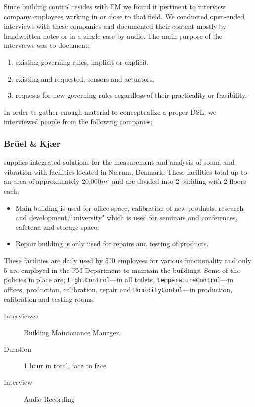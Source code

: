 Since building control resides with FM we found it pertinent to interview company employees working in or close to that field. We conducted open-ended interviews with these companies and documented their content mostly by handwritten notes or in a single case by audio. The main purpose of the interviews was to document;

\begin{enumerate}
	\item existing governing rules, implicit or explicit.
	\item existing and requested, sensors and actuators.
	\item requests for new governing rules regardless of their practicality or feasibility.
\end{enumerate}

In order to gather enough material to conceptualize a proper DSL, we interviewed people from the following companies;

\subsubsection{Br\"{u}el \& Kj\ae r} supplies integrated solutions for the measurement and analysis of sound and vibration with facilities located in N\ae rum, Denmark. These facilities total up to an area of approximately 20,000$m^2$ and are divided into 2 building with 2 floors each; 
\begin{itemize}
	\item Main building is used for office space, calibration of new products, research and development,``university" which is used for seminars and conferences, cafeteria and storage space.
	\item Repair building is only used for repairs and testing of products.
\end{itemize}	
These facilities are daily used by 500 employees for various functionality and only 5 are employed in the FM Department to maintain the buildings. Some of the policies in place are; \texttt{LightControl}---in all toilets,  \texttt{TemperatureControl}---in offices, production, calibration, repair and \texttt{HumidityContol}---in production, calibration and testing rooms.
\begin{description}
	\item[Interviewee] Building Maintanance Manager.
	\item[Duration] 1 hour in total, face to face
	\item[Interview] Audio Recording
\end{description}

